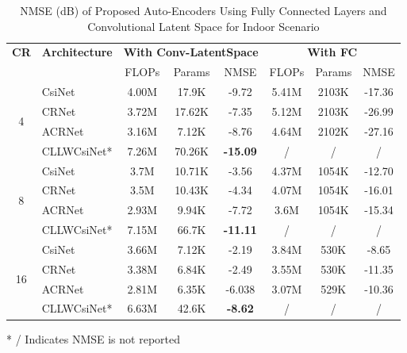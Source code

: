 \documentclass[lettersize,journal]{IEEEtran}
\begin{document}
\begin{table}[ht]
	\centering
	\caption{NMSE (dB) of Proposed Auto-Encoders Using Fully Connected Layers and Convolutional Latent Space for Indoor Scenario}
	\label{table:convlatenspacecomp}
	\begin{threeparttable}
		\begin{tabular}{clcccccc}
			\toprule
			\textbf{CR} & \textbf{Architecture} & \multicolumn{3}{c}{\textbf{With Conv-LatentSpace}} & \multicolumn{3}{c}{\textbf{With FC}} \\ 
			& & FLOPs & Params & NMSE & FLOPs & Params & NMSE \\ 
			\midrule
			\multirow{4}{*}{4} & CsiNet\cite{abe} & 4.00M & 17.9K & -9.72 & 5.41M & 2103K & -17.36 \\  
			& CRNet\cite{abn} & 3.72M & 17.62K & -7.35 & 5.12M & 2103K & -26.99 \\  
			& ACRNet\cite{abx} & 3.16M & 7.12K & -8.76 & 4.64M & 2102K & -27.16 \\
			& CLLWCsiNet* & 7.26M & 70.26K & \textbf{-15.09} & / & / & / \\ 
			\midrule
			\multirow{4}{*}{8} & CsiNet\cite{abe} & 3.7M & 10.71K & -3.56 & 4.37M & 1054K & -12.70 \\  
			& CRNet\cite{abn} & 3.5M & 10.43K & -4.34 & 4.07M & 1054K & -16.01 \\ 
			& ACRNet\cite{abx} & 2.93M & 9.94K & -7.72 & 3.6M & 1054K & -15.34 \\
			& CLLWCsiNet* & 7.15M & 66.7K & \textbf{-11.11} & / & / & / \\ 
			\midrule
			\multirow{4}{*}{16} & CsiNet\cite{abe} & 3.66M & 7.12K & -2.19 & 3.84M & 530K & -8.65 \\  
			& CRNet\cite{abn} & 3.38M & 6.84K & -2.49 & 3.55M & 530K & -11.35 \\ 
			& ACRNet\cite{abx} & 2.81M & 6.35K & -6.038 & 3.07M & 529K & -10.36 \\
			& CLLWCsiNet* & 6.63M & 42.6K & \textbf{-8.62} & / & / & / \\ 
			\bottomrule
		\end{tabular}
		\begin{tablenotes}[flushleft]
			\item[*] / Indicates NMSE is not reported
		\end{tablenotes}
	\end{threeparttable}
\end{table}
\end{document}
